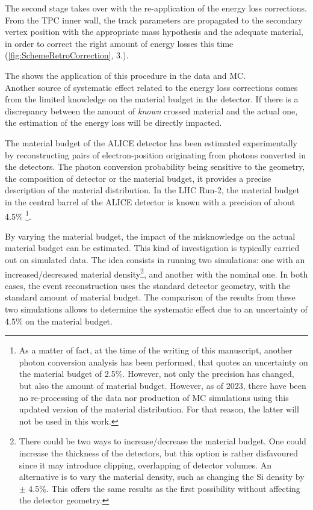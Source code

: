The second stage takes over with the re-application of the energy loss corrections. From the TPC inner wall, the track parameters are propagated to the secondary vertex position with the appropriate mass hypothesis and the adequate material, in order to correct the right amount of energy losses this time (\fig\ref{fig:SchemeRetroCorrection}, 3.).

The \fig shows the application of this procedure in the data and MC.\\

Another source of systematic effect related to the energy loss corrections comes from the limited knowledge on the material budget in the detector. If there is a discrepancy between the amount of \textit{known} crossed material and the actual one, the estimation of the energy loss will be directly impacted. 

The material budget of the ALICE detector has been estimated experimentally by reconstructing pairs of electron-position originating from photons converted in the detectors. The photon conversion probability being sensitive to the geometry, the composition of detector or the material budget, it provides a precise description of the material distribution. In the LHC Run-2, the material budget in the central barrel of the ALICE detector is known with a precision of about 4.5\% \cite{alicecollaborationPerformanceALICEExperiment2014}\cite{alicecollaborationValidationALICEMaterial2022}\footnote{As a matter of fact, at the time of the writing of this manuscript, another photon conversion analysis \cite{alicecollaborationDatadrivenPrecisionDetermination2023} has been performed, that quotes an uncertainty on the material budget of 2.5\%. However, not only the precision has changed, but also the amount of material budget. However, as of 2023, there have been no re-processing of the data nor production of MC simulations using this updated version of the material distribution. For that reason, the latter will not be used in this work.}. 


By varying the material budget, the impact of the misknowledge on the actual material budget can be estimated. This kind of investigation is typically carried out on simulated data. The idea consists in running two simulations: one with an increased/decreased material density\footnote{There could be two ways to increase/decrease the material budget. One could increase the thickness of the detectors, but this option is rather disfavoured since it may introduce clipping, overlapping of detector volumes. An alternative is to vary the material density, such as changing the Si density by $\pm$ 4.5\%. This offers the same results as the first possibility without affecting the detector geometry.}, and another with the nominal one. In both cases, the event reconstruction uses the standard detector geometry, \ie with the standard amount of material budget. The comparison of the results from these two simulations allows to determine the systematic effect due to an uncertainty of 4.5\% on the material budget.

